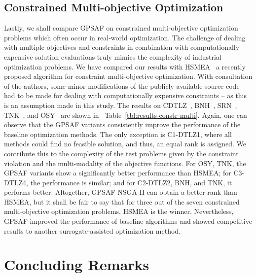 \documentclass[journal]{IEEEtran}
\begin{document}
\subsection{Constrained Multi-objective Optimization}



Lastly, we shall compare GPSAF on constrained multi-objective optimization problems which often occur in real-world optimization. The challenge of dealing with multiple objectives and constraints in combination with computationally expensive solution evaluations truly mimics the complexity of industrial optimization problems.
We have compared our results with HSMEA~\cite{2019-habib-hsmea} a recently proposed algorithm for constraint multi-objective optimization. 
With consultation of the authors, some minor modifications of the publicly available source code had to be made for dealing with computationally expensive constraints -- as this is an assumption made in this study.
The results on CDTLZ~\cite{2014-deb-nsga3-part2}, BNH~\cite{1997-binh-bnh}, SRN~\cite{1994-srinivas-srn}, TNK~\cite{1995-tanaka-tnk}, and OSY~\cite{1995-osyczka-osy} are shown in~ Table~\ref{tbl:results-constr-multi}.
Again, one can observe that the GPSAF variants consistently improve the performance of the baseline optimization methods. The only exception is C1-DTLZ1, where all methods could find no feasible solution, and thus, an equal rank is assigned. We contribute this to the complexity of the test problems given by the constraint violation and the multi-modality of the objective functions.
For OSY, TNK, the GPSAF variants show a significantly better performance than HSMEA; for C3-DTLZ4, the performance is similar; and for C2-DTLZ2, BNH, and TNK, it performs better.
Altogether, GPSAF-NSGA-II can obtain a better rank than HSMEA, but it shall be fair to say that for three out of the seven constrained multi-objective optimization problems, HSMEA is the winner. 
Nevertheless, GPSAF improved the performance of baseline algorithms and showed competitive results to another surrogate-assisted optimization method.




\section{Concluding Remarks}
\label{sec:conclusion}
\end{document}
